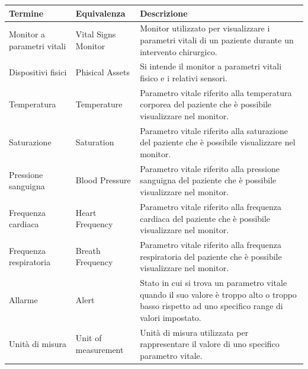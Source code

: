 \bgroup
\def\arraystretch{1.5}
\begin{table}[H]
    \begin{tabular}{ |m{3cm}|m{3cm}|m{5cm}| } 
        \hline
        \textbf{Termine} & \textbf{Equivalenza} & \textbf{Descrizione}
        \\\hline
        Monitor a parametri vitali & Vital Signs Monitor & Monitor utilizzato per visualizzare i parametri vitali di un paziente durante un intervento chirurgico.
        \\\hline
        Dispositivi fisici &  Phisical Assets & Si intende il monitor a parametri vitali fisico e i relativi sensori.
        \\\hline
        Temperatura & Temperature & Parametro vitale riferito alla temperatura corporea del paziente che è possibile visualizzare nel monitor.
        \\\hline
        Saturazione & Saturation & Parametro vitale riferito alla saturazione del paziente che è possibile visualizzare nel monitor.
        \\\hline
        Pressione sanguigna & Blood Pressure & Parametro vitale riferito alla pressione sanguigna del paziente che è possibile visualizzare nel monitor.
        \\\hline
        Frequenza cardiaca & Heart Frequency & Parametro vitale riferito alla frequenza cardiaca  del paziente che è possibile visualizzare nel monitor.
        \\\hline
        Frequenza respiratoria & Breath Frequency  & Parametro vitale riferito alla frequenza respiratoria del paziente che è possibile visualizzare nel monitor.
        \\\hline
        Allarme &  Alert & Stato in cui si trova un parametro vitale quando il suo valore è troppo alto o troppo basso rispetto ad uno specifico range di valori impostato.
        \\\hline
        Unità di misura & Unit of measurement & Unità di misura utilizzata per rappresentare il valore di uno specifico parametro vitale.
        \\\hline
    \end{tabular}
\end{table}
\egroup

